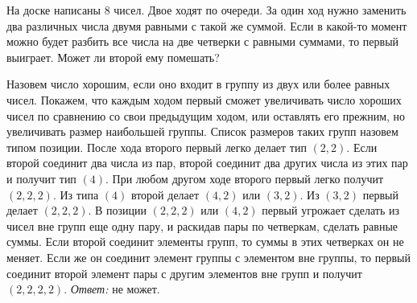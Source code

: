 На доске написаны $8$ чисел.
Двое ходят по очереди.
За один ход нужно заменить два различных числа двумя равными с такой же суммой.
Если в какой-то момент можно будет разбить все числа на две четверки с равными
суммами, то первый выиграет.
Может ли второй ему помешать?

\solution
Назовем число хорошим, если оно входит в группу из двух или более равных чисел.
Покажем, что каждым ходом первый сможет увеличивать число хороших чисел по
сравнению со свои предыдущим ходом, или оставлять его прежним, но увеличивать
размер наибольшей группы.
Список размеров таких групп назовем типом позиции.
После хода второго первый легко делает тип $(2, 2)$.
Если второй соединит два числа из пар, второй соединит два других числа из этих
пар и получит тип $(4)$.
При любом другом ходе второго первый легко получит $(2, 2, 2)$.
Из типа $(4)$ второй делает $(4, 2)$ или $(3, 2)$.
Из $(3, 2)$ первый делает $(2, 2, 2)$.
В позиции $(2, 2, 2)$ или $(4, 2)$ первый угрожает сделать из чисел вне групп
еще одну пару, и раскидав пары по четверкам, сделать равные суммы.
Если второй соединит элементы групп, то суммы в этих четверках он не меняет.
Если же он соединит элемент группы с элементом вне группы, то первый соединит
второй элемент пары с другим элементов вне групп и получит $(2, 2, 2, 2)$.
\emph{Ответ:} не может.

